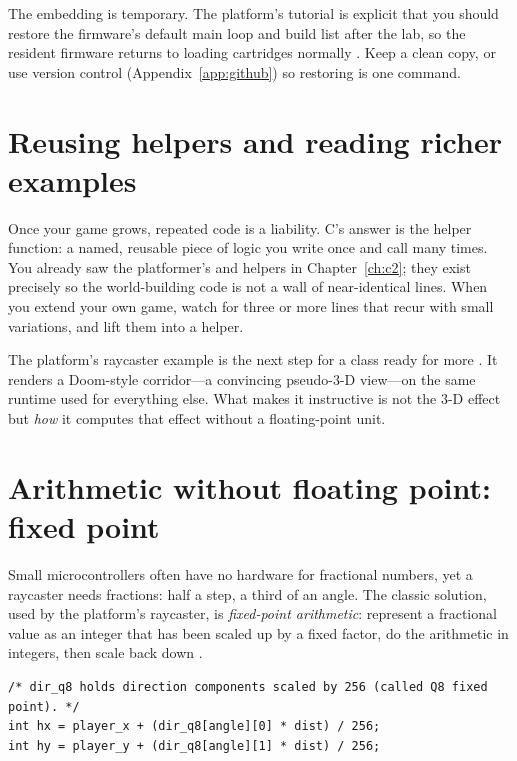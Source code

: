 \begin{prgwarn}
The embedding is temporary. The platform's tutorial is explicit that you should
restore the firmware's default main loop and build list after the lab, so the
resident firmware returns to loading cartridges normally \citep{prg32tutorialc}.
Keep a clean copy, or use version control (Appendix~\ref{app:github}) so restoring
is one command.
\end{prgwarn}

\section{Reusing helpers and reading richer examples}

Once your game grows, repeated code is a liability. C's answer is the helper
function: a named, reusable piece of logic you write once and call many times. You
already saw the platformer's  and  helpers in
Chapter~\ref{ch:c2}; they exist precisely so the world-building code is not a wall
of near-identical lines. When you extend your own game, watch for three or more
lines that recur with small variations, and lift them into a helper.

The platform's raycaster example is the next step for a class ready for more
\citep{prg32teaching}. It renders a Doom-style corridor---a convincing pseudo-3-D
view---on the same \riscv runtime used for everything else. What makes it
instructive is not the 3-D effect but \emph{how} it computes that effect without a
floating-point unit.

\section{Arithmetic without floating point: fixed point}

Small microcontrollers often have no hardware for fractional numbers, yet a
raycaster needs fractions: half a step, a third of an angle. The classic solution,
used by the platform's raycaster, is \emph{fixed-point arithmetic}: represent a
fractional value as an integer that has been scaled up by a fixed factor, do the
arithmetic in integers, then scale back down \citep{prg32tutorialc,prg32repo}.

\begin{lstlisting}[style=c,caption={Fixed-point in the raycaster. Direction vectors are stored scaled by 256; multiplying and then dividing by 256 keeps the fraction.}]
/* dir_q8 holds direction components scaled by 256 (called Q8 fixed point). */
int hx = player_x + (dir_q8[angle][0] * dist) / 256;
int hy = player_y + (dir_q8[angle][1] * dist) / 256;
\end{lstlisting}

